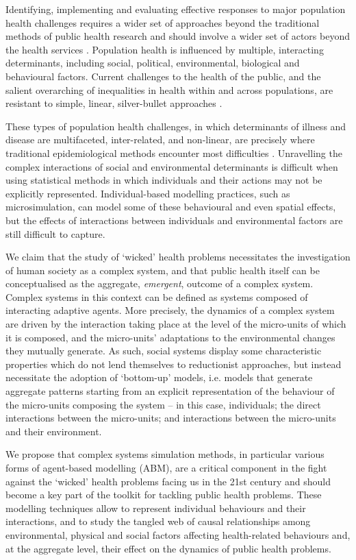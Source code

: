 \documentclass[review]{elsarticle}
\begin{document}
Identifying, implementing and evaluating effective responses to major population health challenges requires a wider set of approaches beyond the traditional methods of public health research and should involve a wider set of actors beyond the health services \citep{academy2016}. Population health is influenced by multiple, interacting determinants, including social, political, environmental, biological and behavioural factors. Current challenges to the health of the public, and the salient overarching of inequalities in health within and across populations, are resistant to simple, linear, silver-bullet approaches \citep{rutter2017}.

These types of population health challenges, in which determinants of illness and disease are multifaceted, inter-related, and non-linear, are precisely where traditional epidemiological methods encounter most difficulties \citep{galea2010}.  Unravelling the complex interactions of social and environmental determinants is difficult when using statistical methods in which individuals and their actions may not be explicitly represented.  Individual-based modelling practices, such as microsimulation, can model some of these behavioural and even spatial effects, but the effects of interactions between individuals and environmental factors are still difficult to capture.

We claim that the study of `wicked' health problems necessitates the investigation of human society as a complex system, and that public health itself can be conceptualised as the aggregate, \emph{emergent}, outcome of a complex system. Complex systems in this context can be defined as systems composed of interacting adaptive agents. More precisely, the dynamics of a complex system are driven by the interaction taking place at the level of the micro-units of which it is composed, and the micro-units' adaptations to the environmental changes they mutually generate. As such, social systems display some characteristic properties which do not lend themselves to reductionist approaches, but instead necessitate the adoption of `bottom-up' models, i.e. models that generate aggregate patterns starting from an explicit representation of the behaviour of the micro-units composing the system -- in this case, individuals; the direct interactions between the micro-units; and interactions between the micro-units and their environment. 

We propose that complex systems simulation methods, in particular various forms of agent-based modelling (ABM), are a critical component in the fight against the `wicked' health problems facing us in the 21st century and should become a key part of the toolkit for tackling public health problems. These modelling techniques allow to represent individual behaviours and their interactions, and to study the tangled web of causal relationships among environmental, physical and social factors affecting health-related behaviours and, at the aggregate level, their effect on the dynamics of public health problems.
\end{document}
